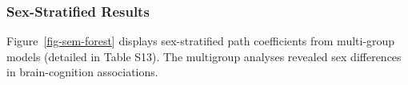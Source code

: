 \documentclass[
]{article}
\begin{document}
\begin{table}

\caption{\label{tbl-sem-paths}\textbf{Pooled brain-cognition path
coefficients.} Beta = standardized path coefficient; CI from 2000
bootstrap resamples. Memory-specific factor paths not shown due to
factor collapse.}


\end{table}%

\subsubsection{Sex-Stratified Results}\label{sex-stratified-results}

Figure~\ref{fig-sem-forest} displays sex-stratified path coefficients
from multi-group models (detailed in Table S13). The multigroup analyses
revealed sex differences in brain-cognition associations.
\end{document}
